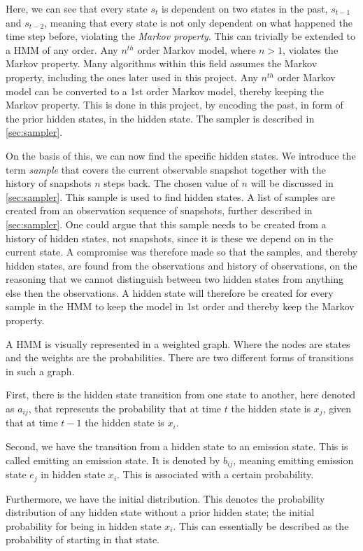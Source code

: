 Here, we can see that every state $s_t$ is dependent on two states in the past, $s_{t-1}$ and $s_{t-2}$, meaning that every state is not only dependent on what happened the time step before, violating the \emph{Markov property}. This can trivially be extended to a HMM of any order. Any $n^{th}$ order Markov model, where $n>1$, violates the Markov property. Many algorithms within this field assumes the Markov property, including the ones later used in this project. Any $n^{th}$ order Markov model can be converted to a 1st order Markov model, thereby keeping the Markov property. This is done in this project, by encoding the past, in form of the prior hidden states, in the hidden state. The sampler is described in \cref{sec:sampler}.

On the basis of this, we can now find the specific hidden states. We introduce the term \emph{sample} that covers the current observable snapshot together with the history of snapshots $n$ steps back. The chosen value of $n$ will be discussed in \cref{sec:sampler}. This sample is used to find hidden states. A list of samples are created from an observation sequence of snapshots, further described in \cref{sec:sampler}. One could argue that this sample needs to be created from a history of hidden states, not snapshots, since it is these we depend on in the current state. A compromise was therefore made so that the samples, and thereby hidden states, are found from the observations and history of observations, on the reasoning that we cannot distinguish between two hidden states from anything else then the observations. A hidden state will therefore be created for every sample in the HMM to keep the model in 1st order and thereby keep the Markov property.

A HMM is visually represented in a weighted graph. Where the nodes are states and the weights are the probabilities.
 There are two different forms of transitions in such a graph.

First, there is the hidden state transition from one state to another, here denoted as $a_{ij}$, that represents the probability that at time $t$ the hidden state is $x_j$, given that at time $t-1$ the hidden state is $x_i$.

Second, we have the transition from a hidden state to an emission state. This is called emitting an emission state. It is denoted by $b_{ij}$, meaning emitting emission state $e_j$ in hidden state $x_i$. This is associated with a certain probability.

Furthermore, we have the initial distribution. This denotes the probability distribution of any hidden state without a prior hidden state; the initial probability for being in hidden state $x_i$. This can essentially be described as the probability of starting in that state.

